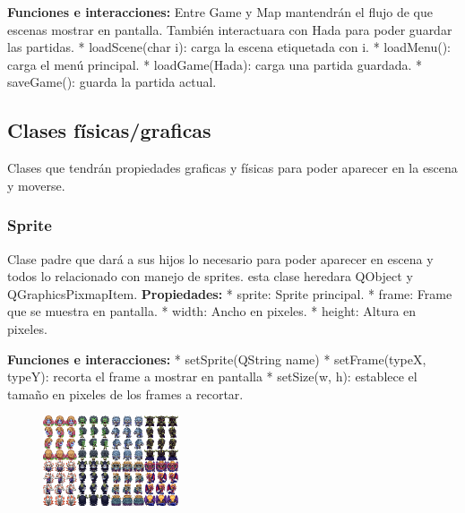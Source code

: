\documentclass{article}
\begin{document}
\subitem \textbf{Funciones e interacciones:} \newline
Entre Game y Map mantendrán el flujo de que escenas mostrar en pantalla. También interactuara con Hada para poder guardar las partidas.\newline
* loadScene(char i): carga la escena etiquetada con i.\newline
* loadMenu(): carga el menú principal.\newline
* loadGame(Hada): carga una partida guardada.\newline
* saveGame(): guarda la partida actual.\newline


\subsection{Clases físicas/graficas}
Clases que tendrán propiedades graficas y físicas para poder aparecer en la escena y moverse.\newline

\subsubsection*{Sprite}
Clase padre que dará a sus hijos lo necesario para poder aparecer en escena y todos lo relacionado con manejo de sprites. esta clase heredara QObject y QGraphicsPixmapItem. \newline
\subitem \textbf{Propiedades:} \newline
* sprite: Sprite principal.\newline
* frame: Frame que se muestra en pantalla.\newline
* width: Ancho en pixeles.\newline
* height: Altura en pixeles.\newline

\subitem \textbf{Funciones e interacciones:} \newline
* setSprite(QString name)\newline
* setFrame(typeX, typeY): recorta el frame a mostrar en pantalla\newline
* setSize(w, h): establece el tamaño en pixeles de los frames a recortar.\newline

\begin{figure}[!ht]
	\includegraphics[width=4cm]{Enemigos.png}
	\centering
\end{figure}
\end{document}

